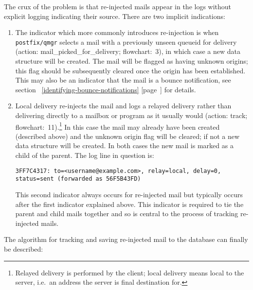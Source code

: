 \documentclass[a4paper,12pt,draft]{article}
\newcommand{\refwithpage}[1]{%
    \empty{}\ref{#1} [page~\pageref{#1}]%
}
\newcommand{\daemon}[1]{%
    \texttt{postfix/#1}%
}
\begin{document}
The crux of the problem is that re-injected mails appear in the logs
without explicit logging indicating their source.  There are two implicit
indications:

\begin{enumerate}

    \item The indicator which more commonly introduces re-injection is when
        \daemon{qmgr} selects a mail with a previously unseen
        queueid for delivery (action: mail\_picked\_for\_delivery;
        flowchart:~3), in which case a new data structure will be created.
        The mail will be flagged as having unknown origins; this flag
        should be subsequently cleared once the origin has been
        established.  This may also be an indicator that the mail is a
        bounce notification, see
        section~\refwithpage{identifying-bounce-notifications} for details.

    \item Local delivery re-injects the mail and logs a relayed delivery
        rather than delivering directly to a mailbox or program as it
        usually would (action: track; flowchart:~11).\footnote{Relayed
        delivery is performed by the \SMTP{} client; local delivery means
        local to the server, i.e.\ an address the server is final
        destination for.} In this case the mail may already have been
        created (described above) and the unknown origin flag will be
        cleared; if not a new data structure will be created.  In both
        cases the new mail is marked as a child of the parent.  The log
        line in question is:

        \texttt{3FF7C4317: to=<username@example.com>, relay=local, \newline 
        delay=0, status=sent (forwarded as 56F5B43FD)}

        This second indicator always occurs for re-injected mail but
        typically occurs after the first indicator explained above.  This
        indicator is required to tie the parent and child mails together
        and so is central to the process of tracking re-injected mails.

\end{enumerate}

The algorithm for tracking and saving re-injected mail to the database can
finally be described:
\end{document}
